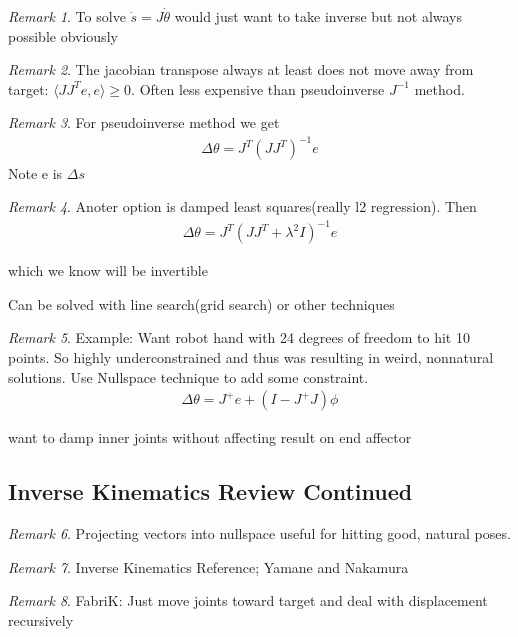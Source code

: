 \documentclass[11pt]{article}
\theoremstyle{remark}
\newtheorem{remark}{Remark}
\begin{document}
\begin{remark}
	To solve $\dot{s} = J\dot{\theta}$ would just want to take inverse but not always possible obviously
\end{remark}

\begin{remark}
	The jacobian transpose always at least does not move away from target: $\langle  J J^T e, e \rangle \geq0$. Often less expensive than pseudoinverse $J^{-1}$ method. 
\end{remark}

\begin{remark}
	For pseudoinverse method we get
	\begin{align*}
		\Delta\theta = J^T(JJ^T)^{-1}e
	\end{align*}
	Note e is $\Delta s$
\end{remark}

\begin{remark}
	Anoter option is damped least squares(really l2 regression). Then
	\begin{align*}
		\Delta \theta = J^T(JJ^T + \lambda^2I)^{-1}e
	\end{align*}

	which we know will be invertible

	Can be solved with line search(grid search) or other techniques
\end{remark}

\begin{remark}
	Example: Want robot hand with 24 degrees of freedom to hit 10 points. So highly underconstrained and thus was resulting in weird, nonnatural solutions. Use Nullspace technique to add some constraint.
	\begin{align*}
		\Delta \theta = J^+e+ (I-J^+J)\phi
	\end{align*}

	want to damp inner joints without affecting result on end affector
\end{remark}

\subsection{Inverse Kinematics Review Continued}

\begin{remark}
	Projecting vectors into nullspace useful for hitting good, natural poses. 
\end{remark}

\begin{remark}
	Inverse Kinematics Reference; Yamane and Nakamura
\end{remark}

\begin{remark}
	FabriK: Just move joints toward target and deal with displacement recursively
\end{remark}
\end{document}
